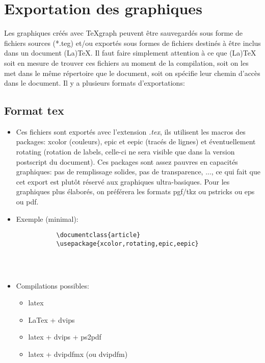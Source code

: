 \chapter{Exportation des graphiques}\label{chapExport}

Les graphiques créés avec TeXgraph peuvent être sauvegardés sous forme de fichiers sources (*.teg) et/ou exportés sous formes de fichiers destinés à être inclus dans un document (La)TeX. Il faut faire simplement attention à ce que (La)TeX soit en mesure de trouver ces fichiers au moment de la compilation, soit on les met dans le même répertoire que le document, soit on spécifie leur chemin d'accès dans le document. Il y a plusieurs formats d'exportations:

\section{Format tex}

\begin{itemize}

\item Ces fichiers sont exportés avec l'extension \textit{.tex}, ils utilisent les macros des packages: xcolor (couleurs), epic et eepic (tracés de lignes) et éventuellement rotating (rotation de labels, celle-ci ne sera visible  que dans la version postscript du document). Ces packages sont assez pauvres en capacités graphiques: pas de remplissage solides, pas de transparence, ..., ce qui fait que cet export est plutôt réservé aux graphiques ultra-basiques. Pour les graphiques plus élaborés, on préférera les formats pgf/tkz ou pstricks ou eps ou pdf.

\item Exemple (minimal):

\begin{verbatim}
           \documentclass{article}
           \usepackage{xcolor,rotating,epic,eepic}
            
             
           
\end{verbatim}

\item Compilations possibles:
\begin{itemize}
\item latex
\item LaTex + dvips
\item latex + dvips + ps2pdf
\item latex + dvipdfmx (ou dvipdfm)
\end{itemize}
\end{itemize}

